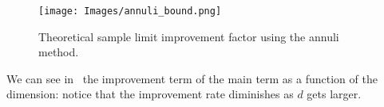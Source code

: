 \begin{figure}[thb]
\centering  
\texttt{[image: Images/annuli\_bound.png]}
\caption{Theoretical sample limit improvement factor using the annuli method. }
\label{fig:annuli_bound}
\end{figure}

We can see in~ the improvement term of the main term as a function of the dimension: notice that the improvement rate diminishes as $d$ gets larger.%

